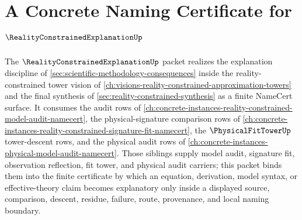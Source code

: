 \chapter{A Concrete Naming Certificate for $\RealityConstrainedExplanationUp$}
\label{ch:concrete-instances-reality-constrained-explanation-namecert}

The $\RealityConstrainedExplanationUp$ packet realizes the explanation discipline of \autoref{sec:scientific-methodology-consequences} inside the reality-constrained tower vision of \autoref{ch:visions-reality-constrained-approximation-towers} and the final synthesis of \autoref{sec:reality-constrained-synthesis} as a finite NameCert surface. It consumes the audit rows of \autoref{ch:concrete-instances-reality-constrained-model-audit-namecert}, the physical-signature comparison rows of \autoref{ch:concrete-instances-reality-constrained-signature-fit-namecert}, the $\PhysicalFitTowerUp$ tower-descent rows, and the physical audit rows of \autoref{ch:concrete-instances-physical-model-audit-namecert}. Those siblings supply model audit, signature fit, observation reflection, fit tower, and physical audit carriers; this packet binds them into the finite certificate by which an equation, derivation, model syntax, or effective-theory claim becomes explanatory only inside a displayed source, comparison, descent, residue, failure, route, provenance, and local naming boundary.

